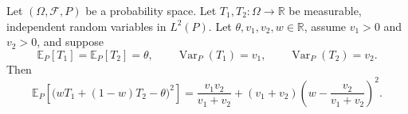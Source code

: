 \begin{theorem}
Let $(\Omega,\mathcal F,P)$ be a probability space. Let
$T_1,T_2:\Omega\to\mathbb R$ be measurable, independent random variables
in $L^2(P)$. Let $\theta,v_1,v_2,w\in\mathbb R$, assume
$v_1>0$ and $v_2>0$, and suppose
\[
 \mathbb E_P[T_1]=\mathbb E_P[T_2]=\theta,
 \qquad
 \operatorname{Var}_P(T_1)=v_1,
 \qquad
 \operatorname{Var}_P(T_2)=v_2.
\]
Then
\[
 \mathbb E_P\!\left[
 \bigl(wT_1+(1-w)T_2-\theta\bigr)^2
 \right]
 =\frac{v_1v_2}{v_1+v_2}
 +(v_1+v_2)\left(w-\frac{v_2}{v_1+v_2}\right)^2.
\]
\end{theorem}
